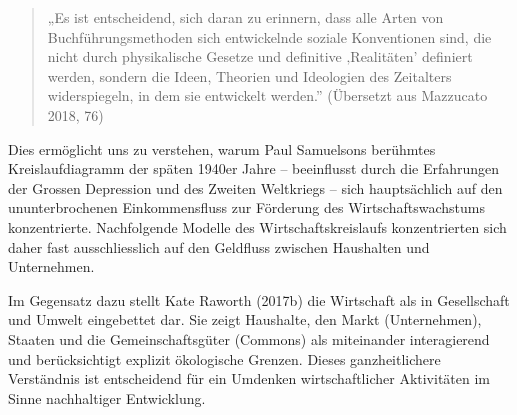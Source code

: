 \documentclass[
  nswissgerman,
  a4paper,
  DIV=11,
  numbers=noendperiod,
  oneside,
  openany]{scrreprt}
\begin{document}
\begin{quote}
„Es ist entscheidend, sich daran zu erinnern, dass alle Arten von
Buchführungsmethoden sich entwickelnde soziale Konventionen sind, die
nicht durch physikalische Gesetze und definitive ‚Realitäten' definiert
werden, sondern die Ideen, Theorien und Ideologien des Zeitalters
widerspiegeln, in dem sie entwickelt werden.'' (Übersetzt aus Mazzucato
2018, 76)
\end{quote}

Dies ermöglicht uns zu verstehen, warum Paul Samuelsons berühmtes
Kreislaufdiagramm der späten 1940er Jahre -- beeinflusst durch die
Erfahrungen der Grossen Depression und des Zweiten Weltkriegs -- sich
hauptsächlich auf den ununterbrochenen Einkommensfluss zur Förderung des
Wirtschaftswachstums konzentrierte. Nachfolgende Modelle des
Wirtschaftskreislaufs konzentrierten sich daher fast ausschliesslich auf
den Geldfluss zwischen Haushalten und Unternehmen.

Im Gegensatz dazu stellt Kate Raworth (2017b) die Wirtschaft als in
Gesellschaft und Umwelt eingebettet dar. Sie zeigt Haushalte, den Markt
(Unternehmen), Staaten und die Gemeinschaftsgüter (Commons) als
miteinander interagierend und berücksichtigt explizit ökologische
Grenzen. Dieses ganzheitlichere Verständnis ist entscheidend für ein
Umdenken wirtschaftlicher Aktivitäten im Sinne nachhaltiger Entwicklung.
\end{document}

